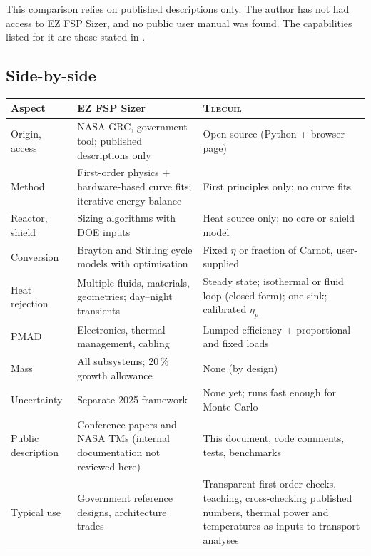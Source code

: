 \documentclass[11pt]{article}
\numberwithin{equation}{section}
\numberwithin{table}{section}
\newcommand{\tlecuil}{\textsc{Tlecuil}}
\begin{document}
\begin{review}
This comparison relies on published descriptions only. The author has not had
access to EZ FSP Sizer, and no public user manual was found. The capabilities listed
for it are those stated in \cite{mason2025trades,charoenboonvivat2025uq}.
\end{review}

\subsection{Side-by-side}
\begin{center}
\small
\begin{tabularx}{\textwidth}{>{\raggedright\arraybackslash}p{}>{\raggedright\arraybackslash}X>{\raggedright\arraybackslash}X}
\toprule
Aspect & EZ FSP Sizer \cite{mason2025trades,charoenboonvivat2025uq} & \tlecuil{} \\
\midrule
Origin, access & NASA GRC, government tool; published descriptions only & Open source (Python + browser page) \\
Method & First-order physics + hardware-based curve fits; iterative energy balance & First principles only; no curve fits \\
Reactor, shield & Sizing algorithms with DOE inputs & Heat source only; no core or shield model \\
Conversion & Brayton and Stirling cycle models with optimisation & Fixed $\eta$ or fraction of Carnot, user-supplied \\
Heat rejection & Multiple fluids, materials, geometries; day--night transients & Steady state; isothermal or fluid loop (closed form); one sink; calibrated $\eta_p$ \\
PMAD & Electronics, thermal management, cabling & Lumped efficiency + proportional and fixed loads \\
Mass & All subsystems; 20\,\% growth allowance & None (by design) \\
Uncertainty & Separate 2025 framework & None yet; runs fast enough for Monte Carlo \\
Public description & Conference papers and NASA TMs (internal documentation not reviewed here) & This document, code comments, tests, benchmarks \\
Typical use & Government reference designs, architecture trades & Transparent first-order checks, teaching, cross-checking published numbers, thermal power and temperatures as inputs to transport analyses \\
\bottomrule
\end{tabularx}
\end{center}
\end{document}
